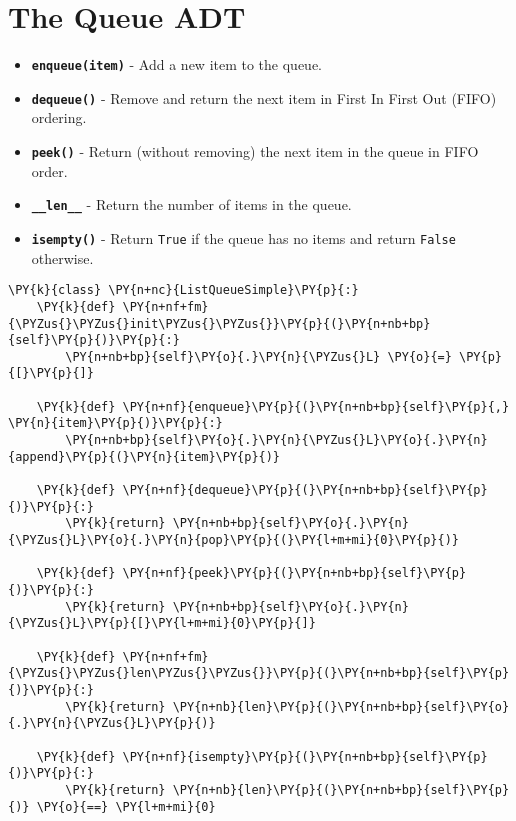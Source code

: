 \section{The Queue ADT}

\begin{itemize}

\item \textbf{\texttt{enqueue(item)}} - Add a new item to the queue.

\item \textbf{\texttt{dequeue()}} - Remove and return the next item in First In First Out (FIFO) ordering.

\item \textbf{\texttt{peek()}} - Return (without removing) the next item in the queue in FIFO order.

\item \textbf{\texttt{\_\_len\_\_}} - Return the number of items in the queue.

\item \textbf{\texttt{isempty()}} - Return \texttt{True} if the queue has no items and return \texttt{False} otherwise.

\end{itemize}
\begin{Verbatim}[commandchars=\\\{\}]
\PY{k}{class} \PY{n+nc}{ListQueueSimple}\PY{p}{:}
    \PY{k}{def} \PY{n+nf+fm}{\PYZus{}\PYZus{}init\PYZus{}\PYZus{}}\PY{p}{(}\PY{n+nb+bp}{self}\PY{p}{)}\PY{p}{:}
        \PY{n+nb+bp}{self}\PY{o}{.}\PY{n}{\PYZus{}L} \PY{o}{=} \PY{p}{[}\PY{p}{]}

    \PY{k}{def} \PY{n+nf}{enqueue}\PY{p}{(}\PY{n+nb+bp}{self}\PY{p}{,} \PY{n}{item}\PY{p}{)}\PY{p}{:}
        \PY{n+nb+bp}{self}\PY{o}{.}\PY{n}{\PYZus{}L}\PY{o}{.}\PY{n}{append}\PY{p}{(}\PY{n}{item}\PY{p}{)}

    \PY{k}{def} \PY{n+nf}{dequeue}\PY{p}{(}\PY{n+nb+bp}{self}\PY{p}{)}\PY{p}{:}
        \PY{k}{return} \PY{n+nb+bp}{self}\PY{o}{.}\PY{n}{\PYZus{}L}\PY{o}{.}\PY{n}{pop}\PY{p}{(}\PY{l+m+mi}{0}\PY{p}{)}

    \PY{k}{def} \PY{n+nf}{peek}\PY{p}{(}\PY{n+nb+bp}{self}\PY{p}{)}\PY{p}{:}
        \PY{k}{return} \PY{n+nb+bp}{self}\PY{o}{.}\PY{n}{\PYZus{}L}\PY{p}{[}\PY{l+m+mi}{0}\PY{p}{]}

    \PY{k}{def} \PY{n+nf+fm}{\PYZus{}\PYZus{}len\PYZus{}\PYZus{}}\PY{p}{(}\PY{n+nb+bp}{self}\PY{p}{)}\PY{p}{:}
        \PY{k}{return} \PY{n+nb}{len}\PY{p}{(}\PY{n+nb+bp}{self}\PY{o}{.}\PY{n}{\PYZus{}L}\PY{p}{)}

    \PY{k}{def} \PY{n+nf}{isempty}\PY{p}{(}\PY{n+nb+bp}{self}\PY{p}{)}\PY{p}{:}
        \PY{k}{return} \PY{n+nb}{len}\PY{p}{(}\PY{n+nb+bp}{self}\PY{p}{)} \PY{o}{==} \PY{l+m+mi}{0}
\end{Verbatim}




